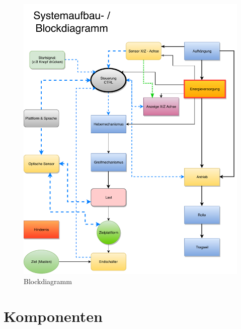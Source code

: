 \documentclass[a4paper]{report}
\begin{document}
\begin{figure}[h!]
	\centering
	\includegraphics[keepaspectratio,width=\textwidth]{Blockdiagramm}
	\caption{Blockdiagramm}
	\label{fig:Blockdiagramm}
\end{figure}

\section{Komponenten}
\label{sec:Pren02Komponenten}
\end{document}
